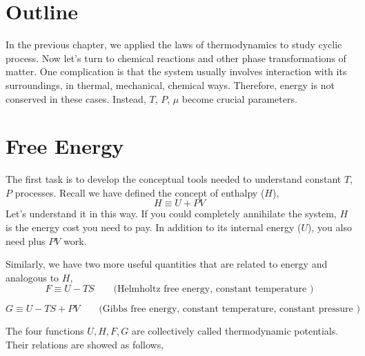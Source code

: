 
\section{Outline}
In the previous chapter, we applied the laws of thermodynamics to study cyclic process.
Now let's turn to chemical reactions and other phase transformations of matter. 
One complication is that the system usually involves interaction with its surroundings,
in thermal, mechanical, chemical ways. Therefore, energy is not conserved in these cases.
Instead, $T$, $P$, $\mu$ become crucial parameters.

\section{Free Energy}
The first task is to develop the conceptual tools needed to understand constant $T$, $P$ processes.
Recall we have defined the concept of enthalpy ($H$),
\begin{equation} \label{entropy} 
H \equiv U + PV
\end{equation}
Let's understand it in this way. If you could completely annihilate the system, $H$ is the energy cost you need to pay.
In addition to its internal energy ($U$), you also need plus $PV$ work.

Similarly, we have two more useful quantities that are related to energy and analogous to $H$,
\begin{equation} \label{entropy} 
F \equiv U - TS    ~~~~~~~~~ \text{(Helmholtz free energy, constant temperature )}
\end{equation}

\begin{equation} \label{entropy} 
G \equiv U - TS + PV   ~~~~~~~~~ \text{(Gibbs free energy, constant temperature, constant pressure )}
\end{equation}

The four functions $U, H, F, G$ are collectively called thermodynamic potentials. Their relations are showed as follows,
\begin{figure}[h]
\centering
{}
\end{figure}

